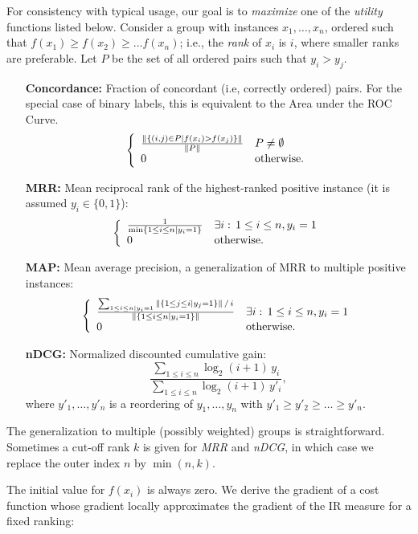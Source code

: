 \documentclass{article}
\begin{document}
For consistency with typical usage, our goal is to \emph{maximize} one
of the \emph{utility} functions listed below. Consider a group with
instances $x_1, \dots, x_n$, ordered such that $f(x_1) \geq f(x_2)
\geq \dots f(x_n)$; i.e., the \emph{rank} of $x_i$ is $i$, where
smaller ranks are preferable. Let $P$ be the set of all ordered pairs
such that $y_i > y_j$.

\begin{enumerate}
\item[{\bf Concordance:}] Fraction of concordant (i.e, correctly ordered)
  pairs. For the special case of binary labels, this is equivalent to
  the Area under the ROC Curve.
$$\left\{ \begin{array}{l l}\frac{\|\{(i,j)\in P |
      f(x_i)>f(x_j)\}\|}{\|P\|}
    & P \neq \emptyset\\
    0 & \mbox{otherwise.}
    \end{array}\right.
$$
\item[{\bf MRR:}] Mean reciprocal rank of the highest-ranked positive
  instance (it is assumed $y_i\in\{0,1\}$):
$$\left\{ \begin{array}{l l}\frac{1}{\min\{1 \leq i \leq n |y_i=1\}}
    & \exists i: \, 1 \leq i \leq n, y_i=1\\
    0 & \mbox{otherwise.}\end{array}\right.$$
\item[{\bf MAP:}] Mean average precision, a generalization of
  MRR to multiple positive instances:
$$\left\{ \begin{array}{l l} \frac{\sum_{1\leq i\leq n | y_i=1} \|\{1\leq j\leq i
    |y_j=1\}\|\,/\,i}{\|\{1\leq i\leq n | y_i=1\}\|}  & \exists i: \,
    1 \leq i \leq n, y_i=1\\ 
    0 & \mbox{otherwise.}\end{array}\right.$$
\item[{\bf nDCG:}] Normalized discounted cumulative gain:
$$\frac{\sum_{1\leq i\leq n} \log_2(i+1) \, y_i}{\sum_{1\leq i\leq n}
  \log_2(i+1) \, y'_i},$$ where $y'_1, \dots, y'_n$ is a reordering of $y_1,
  \dots,y_n$ with $y'_1 \geq y'_2 \geq \dots \geq y'_n$.
\end{enumerate}

The generalization to multiple (possibly weighted) groups is
straightforward. Sometimes a cut-off rank $k$ is given for \emph{MRR}
and \emph{nDCG}, in which case we replace the outer index $n$ by
$\min(n,k)$.

The initial value for $f(x_i)$ is always zero. We derive the gradient of
a cost function whose gradient locally approximates the gradient of
the IR measure for a fixed ranking:
\end{document}
